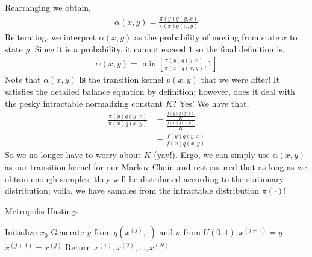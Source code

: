 \documentclass[10pt,a4paper]{article}
\begin{document}
Rearranging we obtain,
\begin{align*}
\alpha(x,y) = \frac{\pi(y)q(y,x)}{\pi(x)q(x,y)}
\end{align*}
Reiterating, we interpret $\alpha(x,y)$ as the probability of moving from state $x$ to state $y$. Since it is a probability, it cannot exceed $1$ so the final definition is,
\begin{align*}
\alpha(x,y) = \min [\frac{\pi(y)q(y,x)}{\pi(x)q(x,y)}, 1]
\end{align*}
Note that $\alpha(x,y)$ {\color{ocre}\textbf{is}} the transition kernel $p(x,y)$ that we were after! It satisfies the detailed balance equation by definition; however, does it deal with the pesky intractable normalizing constant $K$? Yes! We have that,
		\begin{align*}
		\frac{\pi(y)q(y,x)}{\pi(x)q(x,y)} &= \frac{\frac{f(y)q(y,x)}{K}}{\frac{f(x)q(x,y)}{K}}\\
		&= \frac{f(y)q(y,x)}{f(x)q(x,y)}
		\end{align*}
So we no longer have to worry about $K$ (yay!). Ergo, we can simply use $\alpha(x,y)$ as our transition kernel for our Markov Chain and rest assured that as long as we obtain enough samples, they will be distributed according to the stationary distribution; voila, we have samples from the intractable distribution $\pi(\cdot)$!

\vspace{0.5cm}

\begin{algorithm}
\caption{Metropolis Hastings}
\begin{algorithmic}
\State Initialize $x_0$
	\State Generate $y$ from $q(x^{(j)},\cdot)$ and $u$ from $U(0,1)$
		\State $x^{(j+1)}=y$
	\Else
		\State $x^{(j+1)}=x^{(j)}$
	\EndIf
\EndFor
\State Return ${x^{(1)},x^{(2)},\ldots,x^{(N)}}$
\end{algorithmic}
\end{algorithm}

\pagebreak
\end{document}

